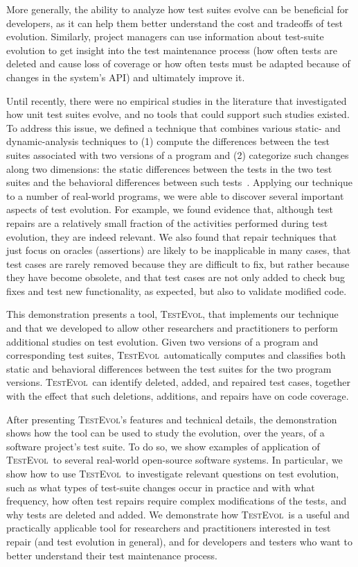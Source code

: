 \documentclass[conference]{IEEEtran}
\newcommand{\tool}{\textsc{TestEvol}\xspace}
\begin{document}
More generally, the ability to analyze how test suites evolve can be
beneficial for developers, as it can help them better understand the
cost and tradeoffs of test evolution. Similarly, project managers can
use information about test-suite evolution to get insight into the
test maintenance process (\eg how often tests are deleted and cause
loss of coverage or how often tests must be adapted because of changes
in the system's API) and ultimately improve it.

Until recently, there were no empirical studies in the literature that
investigated how unit test suites evolve, and no tools that could
support such studies existed. To address this issue, we defined a
technique that combines various static- and dynamic-analysis
techniques to (1) compute the differences between the test suites
associated with two versions of a program and (2) categorize such
changes along two dimensions: the static differences between the tests
in the two test suites and the behavioral differences between such
tests~\cite{pinto12}. Applying our technique to a number of real-world
programs, we were able to discover several important aspects of test
evolution. For example, we found evidence that, although test repairs
are a relatively small fraction of the activities performed during
test evolution, they are indeed relevant.  We also found that repair
techniques that just focus on oracles (\ie assertions) are likely to
be inapplicable in many cases, that test cases are rarely removed
because they are difficult to fix, but rather because they have become
obsolete, and that test cases are not only added to check bug fixes
and test new functionality, as expected, but also to validate modified
code.

This demonstration presents a tool, \tool, that implements our
technique and that we developed to allow other researchers and
practitioners to perform additional studies on test evolution. Given
two versions of a program and corresponding test suites, \tool\
automatically computes and classifies both static and behavioral
differences between the test suites for the two program versions.
\tool\ can identify deleted, added, and repaired test cases, together
with the effect that such deletions, additions, and repairs have on
code coverage.

After presenting \tool's features and technical details, the
demonstration shows how the tool can be used to study the evolution,
over the years, of a software project's test suite.  To do so, we show
examples of application of \tool\ to several real-world open-source
software systems. In particular, we show how to use \tool\ to
investigate relevant questions on test evolution, such as what types
of test-suite changes occur in practice and with what frequency, how
often test repairs require complex modifications of the tests, and why
tests are deleted and added. We demonstrate how \tool\ is a useful and
practically applicable tool for researchers and practitioners
interested in test repair (and test evolution in general), and for
developers and testers who want to better understand their test
maintenance process.
\end{document}
